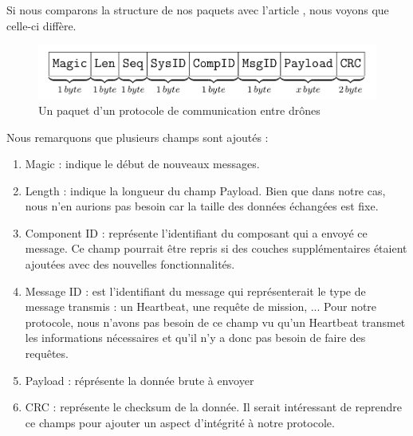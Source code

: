 \documentclass[journal, a4paper]{IEEEtran}
\begin{document}
        Si nous comparons la structure de nos paquets avec l'article \cite{domin2016security}, nous voyons que celle-ci diffère. 

	\begin{figure}[!hbt]
		\begin{center}
                \includegraphics[width=\linewidth]{img/packet.png}
		\caption{Un paquet d'un protocole de communication entre drônes}
		\label{fig:packet}
		\end{center}
	\end{figure}
                
        Nous remarquons que plusieurs champs sont ajoutés : 
        \begin{enumerate}
                \item Magic : indique le début de nouveaux messages. 
                \item Length : indique la longueur du champ Payload. Bien que dans notre cas, nous n'en aurions pas besoin car la taille des données échangées est fixe. 
                \item Component ID : représente l'identifiant du composant qui a envoyé ce message. Ce champ pourrait être repris si des couches supplémentaires étaient ajoutées avec des nouvelles 
                fonctionnalités.
                \item Message ID : est l'identifiant du message qui représenterait le type de message transmis : un Heartbeat, une requête de mission, ... Pour notre protocole, nous n'avons pas besoin 
                de ce champ vu qu'un Heartbeat transmet les informations nécessaires et qu'il n'y a donc pas besoin de faire des requêtes.
                \item Payload : réprésente la donnée brute à envoyer
                \item CRC : représente le checksum de la donnée. Il serait intéressant de reprendre ce champs pour ajouter un aspect d'intégrité à notre protocole.
        \end{enumerate}
\end{document}
